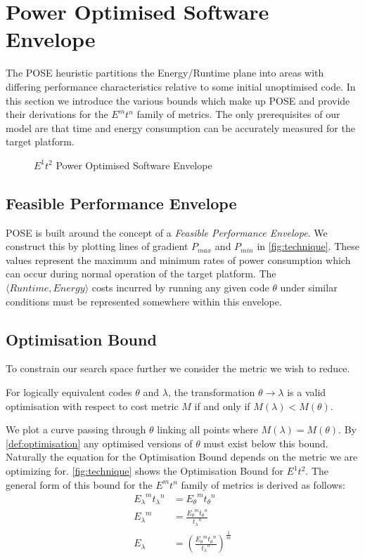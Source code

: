 \section{Power Optimised Software Envelope}
\label{sec:pose}

The POSE heuristic partitions the Energy/Runtime plane into areas with differing performance characteristics relative to some initial unoptimised code.
In this section we introduce the various bounds which make up POSE and provide their derivations for the $E^mt^n$ family of metrics.
The only prerequisites of our model are that time and energy consumption can be accurately measured for the target platform.

\begin{figure}
\centering

\caption{$E^1t^2$ Power Optimised Software Envelope}
\label{fig:technique}
\end{figure}

\subsection{Feasible Performance Envelope}
POSE is built around the concept of a \emph{Feasible Performance Envelope}.
We construct this by plotting lines of gradient $P_{max}$ and $P_{min}$ in \autoref{fig:technique}.
These values represent the maximum and minimum rates of power consumption which can occur during normal operation of the target platform.
The $\langle Runtime, Energy\rangle$ costs incurred by running any given code $\theta$ under similar conditions must be represented somewhere within this envelope.

\subsection{Optimisation Bound}
To constrain our search space further we consider the metric we wish to reduce.

\begin{definition}
For logically equivalent codes $\theta$ and $\lambda$, the transformation ${\theta \to \lambda}$ is a valid optimisation with respect to cost metric $M$ if and only if ${M(\lambda) < M(\theta)}$.
\label{def:optimisation}
\end{definition}

We plot a curve passing through $\theta$ linking all points where ${M(\lambda) = M(\theta)}$. By \autoref{def:optimisation} any optimised versions of $\theta$ must exist below this bound.
Naturally the equation for the Optimisation Bound depends on the metric we are optimizing for.
\autoref{fig:technique} shows the Optimisation Bound for $E^1t^2$.
The general form of this bound for the $E^mt^n$ family of metrics is derived as follows:
\begin{align}
 {E_\lambda}^m{t_\lambda}^n &= {E_\theta}^m{t_\theta}^n \nonumber \\
 {E_\lambda}^m &= \frac{{E_\theta}^m{t_\theta}^n}{{t_\lambda}^n} \nonumber \\
  E_\lambda &= (\frac{{E_\theta}^m{t_\theta}^n}{{t_\lambda}^n})^\frac{1}{m}
\label{eq:optimisation}
\end{align}


